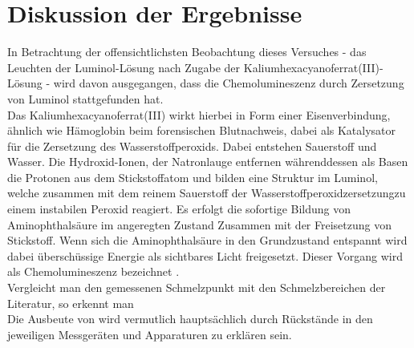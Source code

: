 \section{Diskussion der Ergebnisse}
\label{sec:diskussion}

In Betrachtung der offensichtlichsten Beobachtung dieses Versuches - das Leuchten der Luminol-Lösung nach Zugabe der Kaliumhexacyanoferrat(III)-Lösung - wird davon ausgegangen, dass die Chemolumineszenz durch Zersetzung von Luminol stattgefunden hat. \\
Das Kaliumhexacyanoferrat(III) wirkt hierbei in Form einer Eisenverbindung, ähnlich wie Hämoglobin beim forensischen Blutnachweis, dabei als Katalysator für die Zersetzung des Wasserstoffperoxids. Dabei entstehen Sauerstoff und Wasser. Die Hydroxid-Ionen, der Natronlauge entfernen währenddessen als Basen die Protonen aus dem Stickstoffatom und bilden eine Struktur im Luminol, welche zusammen mit dem reinem Sauerstoff der Wasserstoffperoxidzersetzungzu einem instabilen Peroxid reagiert. Es erfolgt die sofortige Bildung von Aminophthalsäure im angeregten Zustand Zusammen mit der Freisetzung von Stickstoff. Wenn sich die Aminophthalsäure in den Grundzustand entspannt wird dabei überschüssige Energie als sichtbares Licht freigesetzt. Dieser Vorgang wird als Chemolumineszenz bezeichnet \cite{Sabnis.2009}.\\

Vergleicht man den gemessenen Schmelzpunkt mit den Schmelzbereichen der Literatur, so erkennt man \\

Die Ausbeute von  wird vermutlich hauptsächlich durch Rückstände in den jeweiligen Messgeräten und Apparaturen zu erklären sein.